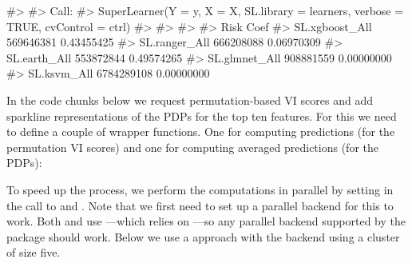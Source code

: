 \begin{Schunk}
\begin{Soutput}
#> 
#> Call:  
#> SuperLearner(Y = y, X = X, SL.library = learners, verbose = TRUE, cvControl = ctrl) 
#> 
#> 
#> 
#>                      Risk       Coef
#> SL.xgboost_All  569646381 0.43455425
#> SL.ranger_All   666208088 0.06970309
#> SL.earth_All    553872844 0.49574265
#> SL.glmnet_All   908881559 0.00000000
#> SL.ksvm_All    6784289108 0.00000000
\end{Soutput}
\end{Schunk}

In the code chunks below we request permutation-based VI scores and add
sparkline representations of the PDPs for the top ten features. For this
we need to define a couple of wrapper functions. One for computing
predictions (for the permutation VI scores) and one for computing
averaged predictions (for the PDPs):

\begin{Schunk}
\end{Schunk}

To speed up the process, we perform the computations in parallel by
setting  in the call to  and
. Note that we first need to set up a parallel
backend for this to work. Both  and  use
 \citep{R-plyr}---which relies on 
\citep{R-foreach}---so any parallel backend supported by the
 package should work. Below we use a  approach
with the  backend \citep{R-doParallel} using a
cluster of size five.

